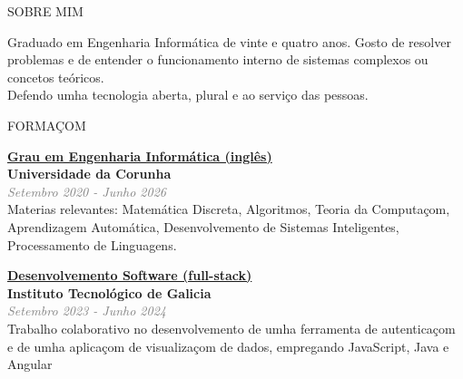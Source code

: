 \documentclass [a4paper] {extarticle} %
\newcommand{\sectionlinethickness} {0.5pt}
\newcommand{\leftcolumwidth} {0.15}
\newcommand{\rightcolumwidth}{0.84}
\newcommand {\sectiontitle}[1] {
  \vspace*{-10pt}
  \begin {flushleft}
  \begin {minipage}[c]{\leftcolumwidth\textwidth}
    \begin {flushright}
      \!\MakeUppercase {#1}
      \hspace* {10pt}
    \end {flushright}
  \end {minipage}
  \begin{minipage}[c]{\rightcolumwidth\textwidth}
    \begin {tikzpicture}[remember picture, overlay,blend mode=multiply]
      \draw [line width=\sectionlinethickness, black] (0,0) -- (15,0);
    \end {tikzpicture}
  \end{minipage}
  \end {flushleft}
}
\begin{document}

\vspace*{-10pt}
\begin {flushleft}
\begin {minipage}[t]{\leftcolumwidth\textwidth}
  \begin {flushright}
  \!\MakeUppercase {sobre mim}
  \hspace* {10pt}
  \end {flushright}
\end {minipage}
\begin{minipage}[t]{\rightcolumwidth\textwidth}
  Graduado em Engenharia Informática de vinte e quatro anos. Gosto de resolver problemas e de entender o funcionamento interno de sistemas complexos ou concetos teóricos.\\
  Defendo umha tecnologia aberta, plural e ao serviço das pessoas.
\end{minipage}
\end {flushleft}


\sectiontitle {formaçom}
\vspace{-15pt}

\begin {flushright}
\begin {minipage} [t] {\rightcolumwidth\textwidth}
  \begin {minipage} [t] {210pt}
    \href {https://estudos.udc.es/en/study/start/614G01V01} {\textbf {Grau em Engenharia Informática (inglês)}}\\
    \textbf {Universidade da Corunha}\\
    \hspace* {6pt} \textcolor{gray}{\textit{Setembro 2020 - Junho 2026}} \\ [4pt]
    Materias relevantes: Matemática Discreta, Algoritmos, Teoria da Computaçom, Aprendizagem Automática, Desenvolvemento de Sistemas Inteligentes,  Processamento de Linguagens.
  \end {minipage}
  \hfill
  \begin {minipage} [t] {200pt}
    \href {https://itg.es/} {\textbf {Desenvolvemento Software (full-stack)}}\\
    \textbf {Instituto Tecnológico de Galicia}\\
    \hspace* {6pt} \textcolor{gray}{\textit{Setembro 2023 - Junho 2024}} \\ [4pt]
    Trabalho colaborativo no desenvolvemento de umha ferramenta de autenticaçom e de umha aplicaçom de visualizaçom de dados, empregando JavaScript, Java e Angular
  \end {minipage}
\end {minipage}
\end {flushright}
\end{document}
